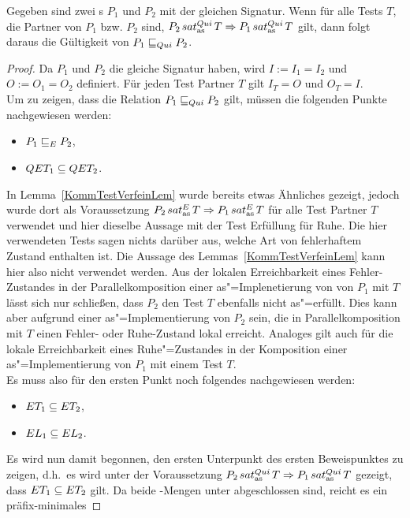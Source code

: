 \begin{Lem}
  \label{RuheTestVerfeinLem}
  Gegeben sind zwei \MEIO{}s $P_1$ und $P_2$ mit der gleichen Signatur. Wenn
  für alle Tests $T$, die Partner von $P_1$ bzw. $P_2$ sind, $P_2\hspace{0.05cm}sat_\mathrm{as}^{Qui}\hspace{0.05cm} T
  \Rightarrow P_1\hspace{0.05cm}sat_\mathrm{as}^{Qui}\hspace{0.05cm} T$ gilt, dann folgt daraus die Gültigkeit von
  $P_1 \sqsubseteq  _{Qui} P_2$.
\end{Lem}
\begin{proof}
  Da $P_1$ und $P_2$ die gleiche Signatur haben, wird $I:=I_1=I_2$ und
  $O:=O_1=O_2$ definiert. Für jeden Test Partner $T$ gilt $I_T=O$ und
  $O_T=I$.\\
  Um zu zeigen, dass die Relation $P_1 \sqsubseteq  _{Qui} P_2$ gilt, müssen die folgenden
  Punkte nachgewiesen werden:
  \begin{itemize}
    \item $P_1 \sqsubseteq  _E P_2$,
    \item $QET _1\subseteq QET _2$.
  \end{itemize}
  In Lemma~\ref{KommTestVerfeinLem} wurde bereits etwas Ähnliches gezeigt,
  jedoch wurde dort als Voraussetzung $P_2\hspace{0.05cm}sat_\mathrm{as}^E\hspace{0.05cm} T\Rightarrow P_1\hspace{0.05cm}sat_\mathrm{as}^E\hspace{0.05cm} T$
  für alle Test Partner $T$ verwendet und hier dieselbe Aussage mit der Test
  Erfüllung für Ruhe. Die hier verwendeten Tests sagen nichts darüber aus,
  welche Art von \glqq fehlerhaftem Zustand\grqq{} enthalten ist. Die Aussage
  des Lemmas~\ref{KommTestVerfeinLem} kann hier also nicht verwendet werden.
  Aus der lokalen Erreichbarkeit eines Fehler-Zustandes in der
  Parallelkomposition einer as"=Implenetierung von von $P_1$ mit $T$ lässt sich
  nur schließen, dass $P_2$ den Test $T$ ebenfalls nicht as"=erfüllt. Dies kann
  aber aufgrund einer as"=Implementierung von $P_2$ sein, die in
  Parallelkomposition mit $T$ einen Fehler- oder Ruhe-Zustand lokal erreicht.
  Analoges gilt auch für die lokale Erreichbarkeit eines Ruhe"=Zustandes in der
  Komposition einer as"=Implementierung von $P_1$ mit einem Test $T$.\\
  Es muss also für den ersten Punkt noch folgendes nachgewiesen werden:
  \begin{itemize}
    \item $ET _1\subseteq ET _2$,
    \item $EL _1\subseteq EL _2$.
  \end{itemize}
  Es wird nun damit begonnen, den ersten Unterpunkt des ersten Beweispunktes zu
  zeigen, d.h.\ es wird unter der Voraussetzung $P_2\hspace{0.05cm}sat_\mathrm{as}^{Qui}\hspace{0.05cm} T\Rightarrow
  P_1\hspace{0.05cm}sat_\mathrm{as}^{Qui}\hspace{0.05cm} T$ gezeigt, dass $ET _1\subseteq ET _2$ gilt. Da beide
  \ET{}-Mengen unter \cont{} abgeschlossen sind, reicht es ein präfix-minimales

\end{proof}
